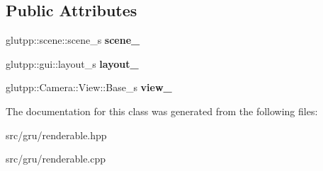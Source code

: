 \subsection*{\-Public \-Attributes}
\begin{DoxyCompactItemize}
\item 
\hypertarget{classglutpp_1_1renderable_a0ef0de3f255d8f8e249ba797609b6dc8}{glutpp\-::scene\-::scene\-\_\-s {\bfseries scene\-\_\-}}\label{classglutpp_1_1renderable_a0ef0de3f255d8f8e249ba797609b6dc8}

\item 
\hypertarget{classglutpp_1_1renderable_a9f2091a43a07d3f8404e89abb578f94f}{glutpp\-::gui\-::layout\-\_\-s {\bfseries layout\-\_\-}}\label{classglutpp_1_1renderable_a9f2091a43a07d3f8404e89abb578f94f}

\item 
\hypertarget{classglutpp_1_1renderable_a683f637a5b58f870a90b7ab0d080b22e}{glutpp\-::\-Camera\-::\-View\-::\-Base\-\_\-s {\bfseries view\-\_\-}}\label{classglutpp_1_1renderable_a683f637a5b58f870a90b7ab0d080b22e}

\end{DoxyCompactItemize}


\-The documentation for this class was generated from the following files\-:\begin{DoxyCompactItemize}
\item 
src/gru/renderable.\-hpp\item 
src/gru/renderable.\-cpp\end{DoxyCompactItemize}
